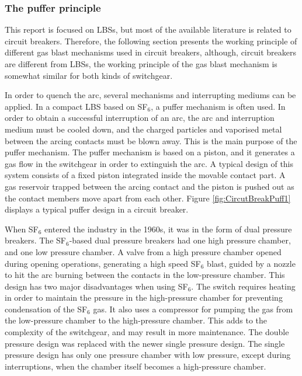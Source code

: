 \documentclass[10pt,b5paper,twoside]{article}
\begin{document}
\subsubsection{The puffer principle} \label{sec:puffer}
This report is focused on LBSs, but most of the available literature is related to circuit breakers. Therefore, the following section presents the working principle of different gas blast mechanisms used in circuit breakers, although, circuit breakers are different from LBSs, the working principle of the gas blast mechanism is somewhat similar for both kinds of switchgear.

In order to quench the arc, several mechanisms and interrupting mediums can be applied. In a compact LBS based on SF$_6$, a puffer mechanism is often used. In order to obtain a successful interruption of an arc, the arc and interruption medium must be cooled down, and the charged particles and vaporised metal between the arcing contacts must be blown away. This is the main purpose of the puffer mechanism. The puffer mechanism is based on a piston, and it generates a gas flow in the switchgear in order to extinguish the arc. A typical design of this system consists of a fixed piston integrated inside the movable contact part. A gas reservoir trapped between the arcing contact and the piston is pushed out as the contact members move apart from each other. Figure \ref{fig:CircutBreakPuff1} displays a typical puffer design in a circuit breaker.

When SF$_6$ entered the industry in the 1960s, it was in the form of dual pressure breakers. The SF$_6$-based dual pressure breakers had one high pressure chamber, and one low pressure chamber. A valve from a high pressure chamber opened during opening operations, generating a high speed SF$_6$ blast, guided by a nozzle to hit the arc burning between the contacts in the low-pressure chamber. This design has two major disadvantages when using SF$_6$. The switch requires heating in order to maintain the pressure in the high-pressure chamber for preventing condensation of the SF$_6$ gas. It also uses a compressor for pumping the gas from the low-pressure chamber to the high-pressure chamber. This adds to the complexity of the switchgear, and may result in more maintenance. The double pressure design was replaced with the newer single pressure design. The single pressure design has only one pressure chamber with low pressure, except during interruptions, when the chamber itself becomes a high-pressure chamber.
\end{document}
